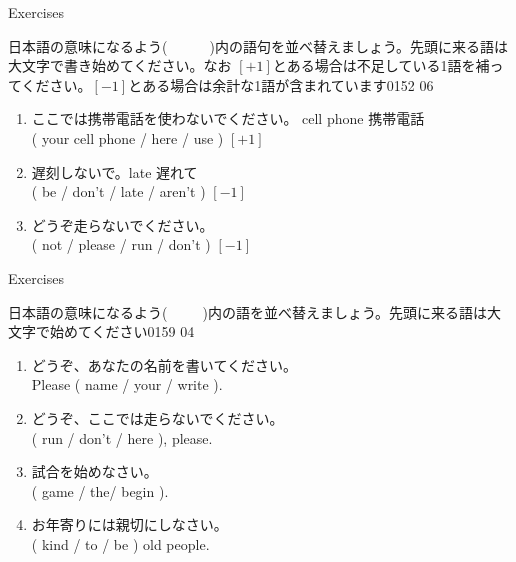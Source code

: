 \documentclass[aspectratio=169,xcolor={dvipsnames,table}]{beamer}
\begin{document}
\begin{frame}[plain]{Exercises}

  {\small 日本語の意味になるよう(~~~~~~)内の語句を並べ替えましょう。先頭に来る語は大文字で書き始めてください。なお $[ +1 ]$とある場合は不足している1語を補ってください。$[ -1 ]$とある場合は余計な1語が含まれています}\hfill{\tiny 0152}\,{\scriptsize {}}\,{\tiny 06}

  \begin{enumerate}
    \item ここでは携帯電話を使わないでください。%
          \hfill{\scriptsize cell phone  携帯電話}\\
          ( your cell phone / here / use ) $[ +1 ]$\\
    \item 遅刻しないで。\hfill{\scriptsize late  遅れて}\\
          ( be / don't / late / aren't ) $[ -1 ]$\\
    \item どうぞ走らないでください。\\
          ( not / please / run / don't ) $[ -1 ]$\\
  \end{enumerate}

\end{frame}
\begin{frame}[plain]{Exercises}

  {\small 日本語の意味になるよう(~~~~~)内の語を並べ替えましょう。先頭に来る語は大文字で始めてください}\hfill{\tiny 0159}\,{\scriptsize {}}\,{\tiny 04}

  \begin{enumerate}
    \item どうぞ、あなたの名前を書いてください。\\
          Please ( name / your / write ).\\
    \item どうぞ、ここでは走らないでください。\\
          ( run / don't / here ), please.\\
    \item 試合を始めなさい。\\
          ( game / the/ begin ).\\
    \item お年寄りには親切にしなさい。\\
          ( kind / to / be ) old people.\\
  \end{enumerate}
\end{frame}
\end{document}
